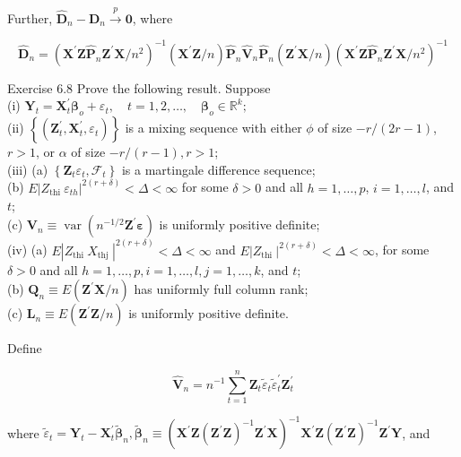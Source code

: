 \documentclass[10pt]{article}
\begin{document}
Further, $\hat{\mathbf{D}}_{n}-\mathbf{D}_{n} \xrightarrow{p} \mathbf{0}$, where

$$
\hat{\mathbf{D}}_{n}=\left(\mathbf{X}^{\prime} \mathbf{Z} \hat{\mathbf{P}}_{n} \mathbf{Z}^{\prime} \mathbf{X} / n^{2}\right)^{-1}\left(\mathbf{X}^{\prime} \mathbf{Z} / n\right) \hat{\mathbf{P}}_{n} \hat{\mathbf{V}}_{n} \hat{\mathbf{P}}_{n}\left(\mathbf{Z}^{\prime} \mathbf{X} / n\right)\left(\mathbf{X}^{\prime} \mathbf{Z} \hat{\mathbf{P}}_{n} \mathbf{Z}^{\prime} \mathbf{X} / n^{2}\right)^{-1}
$$

Exercise 6.8 Prove the following result. Suppose\\
(i) $\mathbf{Y}_{t}=\mathbf{X}_{t}^{\prime} \boldsymbol{\beta}_{o}+\varepsilon_{t}, \quad t=1,2, \ldots, \quad \boldsymbol{\beta}_{o} \in \mathbb{R}^{k} ;$\\
(ii) $\left\{\left(\mathbf{Z}_{t}^{\prime}, \mathbf{X}_{t}^{\prime}, \varepsilon_{t}\right)\right\}$ is a mixing sequence with either $\phi$ of size $-r /(2 r-1)$, $r>1$, or $\alpha$ of size $-r /(r-1), r>1$;\\
(iii) (a) $\left\{\mathbf{Z}_{t} \varepsilon_{t}, \mathcal{F}_{t}\right\}$ is a martingale difference sequence;\\
(b) $E\left|Z_{\text {thi }} \varepsilon_{t h}\right|^{2(r+\delta)}<\Delta<\infty$ for some $\delta>0$ and all $h=1, \ldots, p$, $i=1, \ldots, l$, and $t$;\\
(c) $\mathbf{V}_{n} \equiv \operatorname{var}\left(n^{-1 / 2} \mathbf{Z}^{\prime} \boldsymbol{\varepsilon}\right)$ is uniformly positive definite;\\
(iv) (a) $E\left|Z_{\text {thi }} X_{\text {thj }}\right|^{2(r+\delta)}<\Delta<\infty$ and $E\left|Z_{\text {thi }}\right|^{2(r+\delta)}<\Delta<\infty$, for some $\delta>0$ and all $h=1, \ldots, p, i=1, \ldots, l, j=1, \ldots, k$, and $t$;\\
(b) $\mathbf{Q}_{n} \equiv E\left(\mathbf{Z}^{\prime} \mathbf{X} / n\right)$ has uniformly full column rank;\\
(c) $\mathbf{L}_{n} \equiv E\left(\mathbf{Z}^{\prime} \mathbf{Z} / n\right)$ is uniformly positive definite.

Define

$$
\hat{\mathbf{V}}_{n}=n^{-1} \sum_{t=1}^{n} \mathbf{Z}_{t} \tilde{\varepsilon}_{t} \tilde{\varepsilon}_{t}^{\prime} \mathbf{Z}_{t}^{\prime}
$$

where $\tilde{\varepsilon}_{t}=\mathbf{Y}_{t}-\mathbf{X}_{t}^{\prime} \tilde{\boldsymbol{\beta}}_{n}, \tilde{\boldsymbol{\beta}}_{n} \equiv\left(\mathbf{X}^{\prime} \mathbf{Z}\left(\mathbf{Z}^{\prime} \mathbf{Z}\right)^{-1} \mathbf{Z}^{\prime} \mathbf{X}\right)^{-1} \mathbf{X}^{\prime} \mathbf{Z}\left(\mathbf{Z}^{\prime} \mathbf{Z}\right)^{-1} \mathbf{Z}^{\prime} \mathbf{Y}$, and
\end{document}
